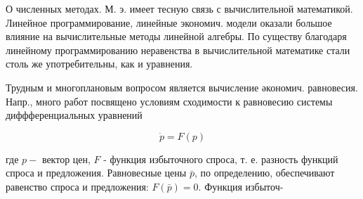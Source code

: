 \documentclass[10pt]{article}
\begin{document}
О численных методах. М. э. имеет тесную связь с вычислительной математикой. Линейное программирование, линейные экономич. модели оказали большое влияние на вычислительные методы линейной алгебры. По существу благодаря линейному программированию неравенства в вычислительной математике стали столь же употребительны, как и уравнения.



Трудным и многоплановым вопросом является вычисление әкономич. равновесия. Напр., много работ посвящено условиям сходимости к равновесию системы диффференциальных уравнений



\[

\dot{p}=F(p)

\]



где $p-$ вектор цен, $F$ - функция избыточного спроса, т. е. разность функций спроса и предложения. Равновесные цены $\bar{p}$, по определению, обеспечивают равенство спроса и предложения: $F(\bar{p})=0$. Функция избыточ-
\end{document}
